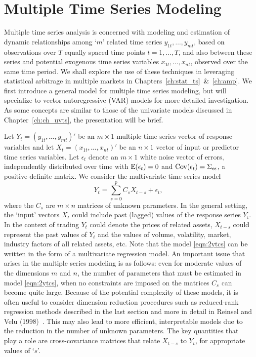 \section{Multiple Time Series Modeling \label{sec:mutimserimod}} \label{in:mts1}

Multiple time series analysis is concerned with modeling and estimation of dynamic relationships among `$m$' related time series $y_{1t}, \ldots, y_{mt}$, based on observations over $T$ equally spaced time points $t= 1, \ldots, T$, and also between these series and potential exogenous time series variables $x_{1t}, \ldots, x_{nt}$, observed over the same time period. We shall explore the use of these techniques in leveraging statistical arbitrage in multiple markets in Chapters~\ref{ch:stat_ts}~\&~\ref{ch:amp}. We first introduce a general model for multiple time series modeling, but will specialize to vector autoregressive (VAR)\label{in:var} models for more detailed investigation. As some concepts are similar to those of the univariate models discussed in Chapter~\ref{ch:ch_uvts}, the presentation will be brief.


Let $Y_t= (y_{1t}, \ldots, y_{mt})'$ be an $m \times 1$ multiple time series vector of response variables and let $X_t=(x_{1t}, \ldots, x_{nt})'$ be an $n \times 1$ vector of input or predictor time series variables. Let $\epsilon_t$ denote an $m \times 1$ white noise vector of errors, independently distributed over time with $\operatorname{E}(\epsilon_t)= 0$ and $\operatorname{Cov}(\epsilon_t)= \Sigma_{\epsilon\epsilon}$, a positive-definite matrix. We consider the multivariate time series model
	\begin{equation} \label{eqn:2ytcs}
	Y_{t} = \sum_{s=0}^{p} C_s X_{t-s} + \epsilon_t,
	\end{equation}
where the $C_s$ are $m \times n$ matrices of unknown parameters. In the general setting, the `input' vectors $X_t$ could include past (lagged) values of the response series $Y_t$. In the context of trading $Y_t$ could denote the prices of related assets, $X_{t-s}$ could represent the past values of $Y_t$ and the values of volume, volatility, market, industry factors of all related assets, etc. Note that the model \eqref{eqn:2ytcs} can be written in the form of a multivariate regression model. An important issue that arises in the multiple series modeling is as follows: even for moderate values of the dimensions $m$ and $n$, the number of parameters that must be estimated in model \eqref{eqn:2ytcs}, when no constraints are imposed on the matrices $C_s$ can become quite large. Because of the potential complexity of these models, it is often useful to consider dimension reduction procedures such as reduced-rank regression methods described in the last section and more in detail in Reinsel and Velu (1998)~\cite{velurein}. This may also lead to more efficient, interpretable models due to the reduction in the number of unknown parameters. The key quantities that play a role are cross-covariance matrices that relate $X_{t-s}$ to $Y_t$, for appropriate values of `$s$'. 


